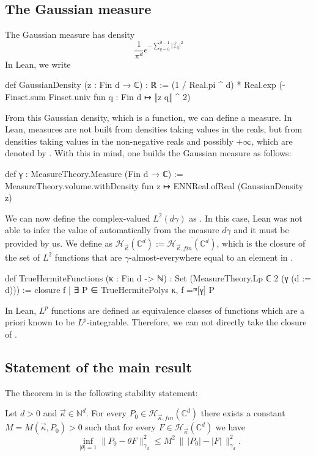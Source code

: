 \documentclass[11pt]{amsart}
\theoremstyle{remark}
\newcommand{\C}{\mathbb{C}}
\newcommand{\N}{\mathbb{N}}
\newcommand{\abs}[1]{\lvert #1 \rvert}
\begin{document}
\subsection{The Gaussian measure}

The Gaussian measure has density
\[
\frac{1}{\pi^d}e^{-\sum_{q=0}^{d-1}\abs{\vec z_q}^2}
\]
In Lean, we write
\begin{leancode}
def GaussianDensity (z : Fin d → ℂ) : ℝ :=
  (1 / Real.pi ^ d) *
    Real.exp (-Finset.sum Finset.univ fun q : Fin d ↦ ‖z q‖ ^ 2)
\end{leancode}
From this Gaussian density, which is a function, we can define a measure. In Lean, measures are not built from densities taking values in the reals, but from densities taking values in the non-negative reals and possibly $+\infty$, which are denoted by . With this in mind, one builds the Gaussian measure as follows:
\begin{leancode}
def γ : MeasureTheory.Measure (Fin d → ℂ) :=
  MeasureTheory.volume.withDensity fun z ↦ ENNReal.ofReal (GaussianDensity z)
\end{leancode}
We can now define the complex-valued $L^2(d\gamma)$ as . In this case, Lean was not able to infer the value of  automatically from the measure $d\gamma$ and it must be provided by us. We define  as $\mathcal H_{\vec \kappa} (\mathbb C^d) := \overline{\mathcal H_{\vec \kappa, fin}(\mathbb C^d)}$, which is the closure of the set of $L^2$ functions that are $\gamma$-almost-everywhere equal to an element in .

\begin{leancode}
def TrueHermiteFunctions (κ : Fin d -> ℕ) :
    Set (MeasureTheory.Lp ℂ 2 (γ (d := d))) :=
  closure { f | ∃ P ∈ TrueHermitePolys κ, f =ᵐ[γ] P }
\end{leancode}
In Lean, $L^p$ functions are defined as equivalence classes of functions which are a priori known to be $L^p$-integrable. Therefore, we can not directly take the closure of .

\subsection{Statement of the main result}
The theorem in  is the following
stability statement:
\begin{theorem*}
Let $d > 0$ and $\vec\kappa\in\N^d$. For every $P_0\in \mathcal H_{\vec\kappa, fin}(\C^d)$ there exists a
constant $M=M(\vec\kappa,P_0)>0$ such that for every
$F\in\mathcal H_{\vec\kappa}(\C^d)$ we have
\[
\inf_{|\theta|=1}\lVert P_0-\theta F \rVert_{\gamma_d}^2
\le
M^2\,\bigl\|\, \lvert P_0\rvert-\lvert F\rvert\,\bigr\|_{\gamma_d}^2.
\]
\end{theorem*}
\end{document}
